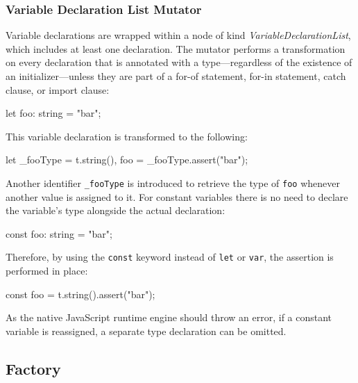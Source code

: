 \subsubsection{Variable Declaration List Mutator}

Variable declarations are wrapped within a node of kind \emph{VariableDeclarationList}, which includes at least one declaration. The mutator performs a transformation on every declaration that is annotated with a type---regardless of the existence of an initializer---unless they are part of a for-of statement, for-in statement, catch clause, or import clause:
\begin{JsCode}[numbers=none]
let foo: string = "bar";
\end{JsCode}
This variable declaration is transformed to the following:
\begin{JsCode}[numbers=none]
let _fooType = t.string(), foo = _fooType.assert("bar");
\end{JsCode}
Another identifier \texttt{\_fooType} is introduced to retrieve the type of \texttt{foo} whenever another value is assigned to it. For constant variables there is no need to declare the variable's type alongside the actual declaration:
\begin{JsCode}[numbers=none]
const foo: string = "bar";
\end{JsCode}
Therefore, by using the \texttt{const} keyword instead of \texttt{let} or \texttt{var}, the assertion is performed in place:
\begin{JsCode}[numbers=none]
const foo = t.string().assert("bar");
\end{JsCode}
As the native JavaScript runtime engine should throw an error, if a constant variable is reassigned, a separate type declaration can be omitted.

\subsection{Factory}
\label{sec:factory}

